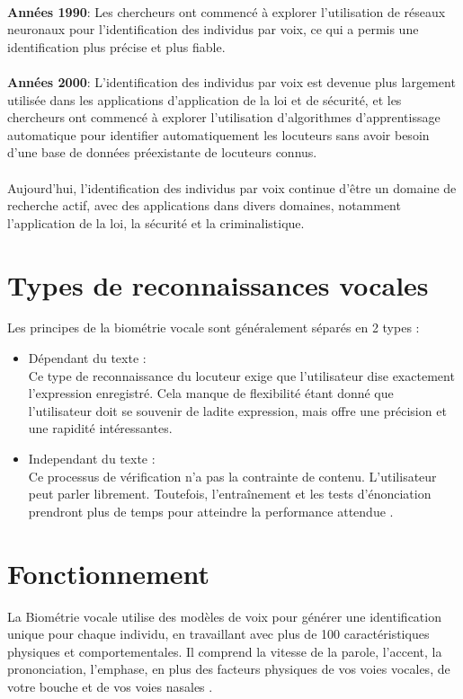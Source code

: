 \paragraph{}\textbf{Années 1990}: Les chercheurs ont commencé à explorer l’utilisation de réseaux neuronaux pour l’identification des individus par voix, ce qui a permis une identification plus précise et plus fiable.
\paragraph{}\textbf{Années 2000}: L’identification des individus par voix est devenue plus largement utilisée dans les applications d’application de la loi et de sécurité, et les chercheurs ont commencé à explorer l’utilisation d’algorithmes d’apprentissage automatique pour identifier automatiquement les locuteurs sans avoir besoin d’une base de données préexistante de locuteurs connus. 
\paragraph{}Aujourd’hui, l’identification des individus par voix continue d’être un domaine de recherche actif, avec des applications dans divers domaines, notamment l’application de la loi, la sécurité et la criminalistique.


\section{Types de reconnaissances vocales}
Les principes de la biométrie vocale sont généralement séparés en 2 types :
\begin{itemize}
    \item Dépendant du texte : \\Ce type de reconnaissance du locuteur exige que l’utilisateur dise exactement l’expression enregistré. Cela manque de flexibilité étant donné que l’utilisateur doit se souvenir de ladite expression, mais offre une précision et une rapidité intéressantes.
    \item Independant du texte : \\Ce processus de vérification n’a pas la contrainte de contenu. L’utilisateur peut parler librement. Toutefois, l’entraînement et les tests d’énonciation prendront plus de temps pour atteindre la performance attendue \cite{timedoctor}.
\end{itemize}

\section{Fonctionnement}
La Biométrie vocale utilise des modèles de voix pour générer une identification unique pour chaque individu, en travaillant avec plus de 100 caractéristiques physiques et comportementales. Il comprend la vitesse de la parole, l'accent, la prononciation, l'emphase, en plus des facteurs physiques de vos voies vocales, de votre bouche et de vos voies nasales \cite{imageware}.

